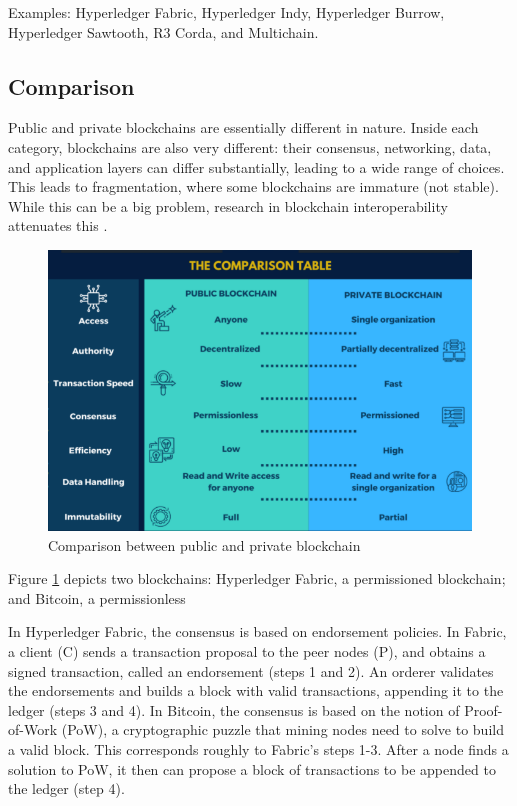 \documentclass[12pt,a4paper]{article}
\theoremstyle{definition}
\begin{document}
Examples: Hyperledger Fabric, Hyperledger Indy, Hyperledger Burrow, Hyperledger Sawtooth, R3 Corda, and Multichain.

\subsection{Comparison}
Public and private blockchains are essentially different in nature. Inside each category, blockchains are also very different: their consensus, networking, data, and application layers can differ substantially, leading to a wide range of choices. This leads to fragmentation, where some blockchains are immature (not stable). While this can be a big problem, research in blockchain interoperability attenuates this \cite{belchior2020}.

\begin{figure}[H]
\centering
\includegraphics[scale=0.45]{figures/PublicVsPrivate.png}
\caption{Comparison between public and private blockchain}
\label{fig:bcs}
\end{figure}



Figure \ref{fig:bcs} depicts two blockchains: Hyperledger Fabric, a permissioned blockchain; and Bitcoin, a permissionless

In Hyperledger Fabric, the consensus is based on endorsement policies. In Fabric, a client (C) sends a transaction proposal to the peer nodes (P), and obtains a signed transaction, called an endorsement (steps 1 and 2). An orderer validates the endorsements and builds a block with valid transactions, appending it to the ledger (steps 3 and 4). In Bitcoin, the consensus is based on the notion of Proof-of-Work (PoW), a cryptographic puzzle that mining nodes need to solve to build a valid block. This corresponds roughly to Fabric’s steps 1-3. After a node finds a solution to PoW, it then can propose a block of transactions to be appended to the ledger (step 4).
\end{document}
